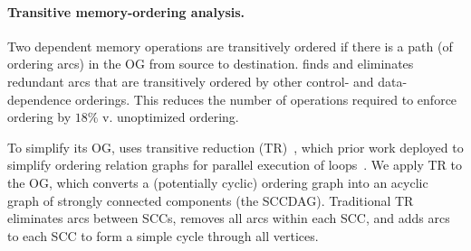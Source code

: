 \paragraph{Transitive memory-ordering analysis.}
Two dependent memory operations are transitively ordered if there is a path (of
ordering arcs) in the OG from source to destination.
%
\riptidecomp finds and eliminates redundant arcs that are
transitively ordered by other control- and data-dependence orderings.
%
%
%
%
%
%
%
This reduces the number of operations required to enforce ordering by $18\%$ v. unoptimized ordering.

To simplify its OG, \riptidecomp uses transitive reduction (TR)~\cite{aho-tr}, which prior work
deployed to simplify ordering relation graphs for parallel
execution of loops~\cite{midkiff-padua,compiler-sync}.
%
%
%
%
%
We apply TR to the OG, which converts a (potentially cyclic) ordering 
graph into an acyclic graph of strongly connected components (the SCCDAG). 
%
Traditional TR eliminates arcs between SCCs,
removes all arcs within each SCC,
and adds arcs to each SCC to form a simple cycle through all vertices.

